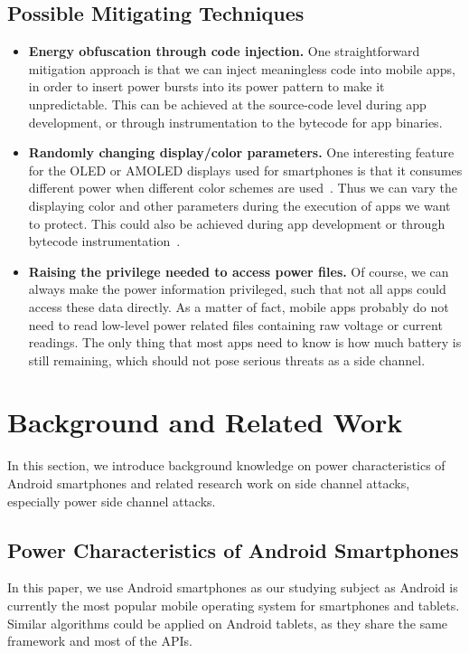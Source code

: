 \documentclass{sig-alternate}
\begin{document}
\subsection{Possible Mitigating Techniques}
\begin{itemize}
\item
\textbf{Energy obfuscation through code injection.} One straightforward mitigation approach is that we can inject meaningless code into mobile apps, in order to insert power bursts into its power pattern to make it unpredictable. This can be achieved at the source-code level during app development, or through instrumentation to the bytecode for app binaries.


\item
\textbf{Randomly changing display/color parameters.}  One interesting feature for the OLED or AMOLED displays used for smartphones is that it consumes different power when different color schemes are used~\cite{dong2012oled}. Thus we can vary the displaying color and other parameters during the execution of apps we want to protect. This could also be achieved during app development or through bytecode instrumentation~\cite{Li:2014:MWA}.

\item
\textbf{Raising the privilege needed to access power files.} Of course, we can always make the power information privileged, such that not all apps could access these data directly. As a matter of fact, mobile apps probably do not need to read low-level power related files containing raw voltage or current readings. The only thing that most apps need to know is how much battery is still remaining, which should not pose serious threats as a side channel.
\end{itemize}

\section{Background and Related Work}
\label{sec:relate}



In this section, we introduce background knowledge on power characteristics of Android smartphones and related research work on side channel attacks, especially power side channel attacks.
\subsection{Power Characteristics of Android Smartphones}

In this paper, we use Android smartphones as our studying subject as Android is currently the most popular mobile operating system for smartphones and tablets. Similar algorithms could be applied on Android tablets, as they share the same framework and most of the APIs.
\end{document}
